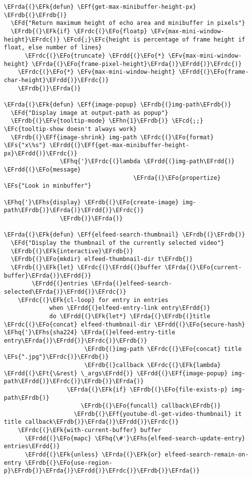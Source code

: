 \documentclass[a4wide,10pt]{article}
\newcommand{\EFc}[1]{\textcolor{EFc}{#1}} %
\newcommand{\EFcd}[1]{\textcolor{EFcd}{#1}} %
\newcommand{\EFs}[1]{\textcolor{EFs}{#1}} %
\newcommand{\EFd}[1]{\textcolor{EFd}{#1}} %
\newcommand{\EFk}[1]{\textcolor{EFk}{#1}} %
\newcommand{\EFf}[1]{\textcolor{EFf}{#1}} %
\newcommand{\EFv}[1]{\textcolor{EFv}{#1}} %
\newcommand{\EFt}[1]{\textcolor{EFt}{#1}} %
\newcommand{\EFo}[1]{\textcolor{EFo}{#1}} %
\newcommand{\EFhn}[1]{\textcolor{EFhn}{\textbf{#1}}} %
\newcommand{\EFhq}[1]{\textcolor{EFhq}{#1}} %
\newcommand{\EFhs}[1]{\textcolor{EFhs}{#1}} %
\newcommand{\EFrda}[1]{\textcolor{EFrda}{#1}} %
\newcommand{\EFrdb}[1]{\textcolor{EFrdb}{#1}} %
\newcommand{\EFrdc}[1]{\textcolor{EFrdc}{#1}} %
\newcommand{\EFrdd}[1]{\textcolor{EFrdd}{#1}} %
\begin{document}
\begin{Code}
\begin{Verbatim}
\EFrda{(}\EFk{defun} \EFf{get-max-minibuffer-height-px} \EFrdb{(}\EFrdb{)}
  \EFd{"Return maximum height of echo area and minibuffer in pixels"}
  \EFrdb{(}\EFk{if} \EFrdc{(}\EFo{floatp} \EFv{max-mini-window-height}\EFrdc{)} \EFcd{;}\EFc{height is percentage of frame height if float, else number of lines}
      \EFrdc{(}\EFo{truncate} \EFrdd{(}\EFo{*} \EFv{max-mini-window-height} \EFrda{(}\EFo{frame-pixel-height}\EFrda{)}\EFrdd{)}\EFrdc{)}
    \EFrdc{(}\EFo{*} \EFv{max-mini-window-height} \EFrdd{(}\EFo{frame-char-height}\EFrdd{)}\EFrdc{)}
    \EFrdb{)}\EFrda{)}

\EFrda{(}\EFk{defun} \EFf{image-popup} \EFrdb{(}img-path\EFrdb{)}
  \EFd{"Display image at output-path as popup"}
  \EFrdb{(}\EFv{tooltip-mode} \EFhn{1}\EFrdb{)} \EFcd{;;} \EFc{tooltip-show doesn't always work}
  \EFrdb{(}\EFf{image-shrink} img-path \EFrdc{(}\EFo{format} \EFs{"x\%s"} \EFrdd{(}\EFf{get-max-minibuffer-height-px}\EFrdd{)}\EFrdc{)}
                \EFhq{'}\EFrdc{(}lambda \EFrdd{(}img-path\EFrdd{)} \EFrdd{(}\EFo{message}
                                     \EFrda{(}\EFo{propertize} \EFs{"Look in minbuffer"}
                                                 \EFhq{'}\EFhs{display} \EFrdb{(}\EFo{create-image} img-path\EFrdb{)}\EFrda{)}\EFrdd{)}\EFrdc{)}
                \EFrdb{)}\EFrda{)}

\EFrda{(}\EFk{defun} \EFf{elfeed-search-thumbnail} \EFrdb{(}\EFrdb{)}
  \EFd{"Display the thumbnail of the currently selected video"}
  \EFrdb{(}\EFk{interactive}\EFrdb{)}
  \EFrdb{(}\EFo{mkdir} elfeed-thumbnail-dir t\EFrdb{)}
  \EFrdb{(}\EFk{let} \EFrdc{(}\EFrdd{(}buffer \EFrda{(}\EFo{current-buffer}\EFrda{)}\EFrdd{)}
        \EFrdd{(}entries \EFrda{(}elfeed-search-selected\EFrda{)}\EFrdd{)}\EFrdc{)}
    \EFrdc{(}\EFk{cl-loop} for entry in entries
             when \EFrdd{(}elfeed-entry-link entry\EFrdd{)}
             do \EFrdd{(}\EFk{let*} \EFrda{(}\EFrdb{(}title \EFrdc{(}\EFo{concat} elfeed-thumbnail-dir \EFrdd{(}\EFo{secure-hash} \EFhq{'}\EFhs{sha224} \EFrda{(}elfeed-entry-title entry\EFrda{)}\EFrdd{)}\EFrdc{)}\EFrdb{)}
                       \EFrdb{(}img-path \EFrdc{(}\EFo{concat} title \EFs{".jpg"}\EFrdc{)}\EFrdb{)}
                       \EFrdb{(}callback \EFrdc{(}\EFk{lambda} \EFrdd{(}\EFt{\&rest} \_args\EFrdd{)} \EFrdd{(}\EFf{image-popup} img-path\EFrdd{)}\EFrdc{)}\EFrdb{)}\EFrda{)}
                  \EFrda{(}\EFk{if} \EFrdb{(}\EFo{file-exists-p} img-path\EFrdb{)}
                      \EFrdb{(}\EFo{funcall} callback\EFrdb{)}
                    \EFrdb{(}\EFf{youtube-dl-get-video-thumbnail} it title callback\EFrdb{)}\EFrda{)}\EFrdd{)}\EFrdc{)}
    \EFrdc{(}\EFk{with-current-buffer} buffer
      \EFrdd{(}\EFo{mapc} \EFhq{\#'}\EFhs{elfeed-search-update-entry} entries\EFrdd{)}
      \EFrdd{(}\EFk{unless} \EFrda{(}\EFk{or} elfeed-search-remain-on-entry \EFrdb{(}\EFo{use-region-p}\EFrdb{)}\EFrda{)}\EFrdd{)}\EFrdc{)}\EFrdb{)}\EFrda{)}


\end{Verbatim}
\end{Code}
\end{document}
